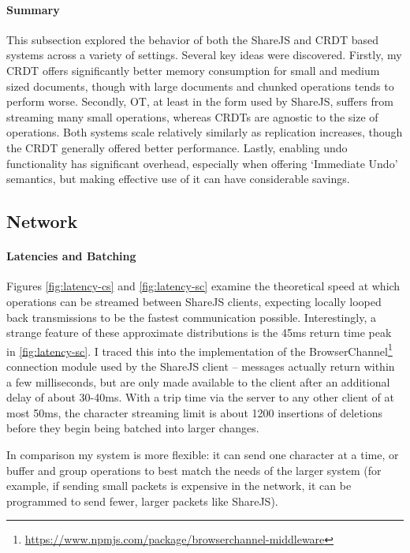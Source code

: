 \documentclass[12pt,a4paper,twoside,openright]{report}
\begin{document}
			\paragraph{Summary}
				This subsection explored the behavior of both the ShareJS and CRDT based systems across a variety of settings. Several key ideas were discovered. Firstly, my CRDT offers significantly better memory consumption for small and medium sized documents, though with large documents and chunked operations tends to perform worse. Secondly, OT, at least in the form used by ShareJS, suffers from streaming many small operations, whereas CRDTs are agnostic to the size of operations. Both systems scale relatively similarly as replication increases, though the CRDT generally offered better performance. Lastly, enabling undo functionality has significant overhead, especially when offering `Immediate Undo' semantics, but making effective use of it can have considerable savings.
					
		\subsection{Network}
			
		
			\paragraph{Latencies and Batching}
			Figures \ref{fig:latency-cs} and \ref{fig:latency-sc} examine the theoretical speed at which operations can be streamed between ShareJS clients, expecting locally looped back transmissions to be the fastest communication possible. Interestingly, a strange feature of these approximate distributions is the 45ms return time peak in \ref{fig:latency-sc}. I traced this into the implementation of the BrowserChannel\footnote{\url{https://www.npmjs.com/package/browserchannel-middleware}} connection module used by the ShareJS client -- messages actually return within a few milliseconds, but are only made available to the client after an additional delay of about 30-40ms. With a trip time via the server to any other client of at most 50ms, the character streaming limit is about 1200 insertions of deletions before they begin being batched into larger changes.
			
			In comparison my system is more flexible: it can send one character at a time, or buffer and group operations to best match the needs of the larger system (for example, if sending small packets is expensive in the network, it can be programmed to send fewer, larger packets like ShareJS).			
			
\end{document}
